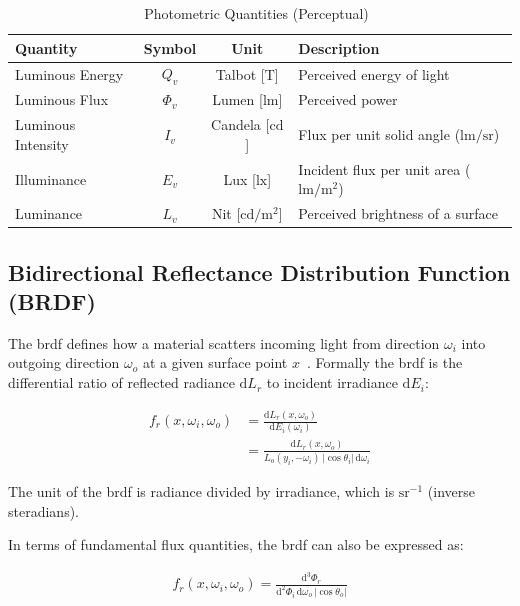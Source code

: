 \begin{table}
    \centering
    \caption{Photometric Quantities (Perceptual)~\cite{tuwien_rendering_2020}}
    \label{tab:photometric-quantities}
    \begin{tabular}{lccl}
        \toprule
        \textbf{Quantity} & \textbf{Symbol} & \textbf{Unit} & \textbf{Description} \\
        \midrule
        Luminous Energy & $Q_v$ & Talbot [$\mathrm{T}$] & Perceived energy of light \\
        Luminous Flux & $\Phi_v$ & Lumen [$\mathrm{lm}$] & Perceived power \\
        Luminous Intensity & $I_v$ & Candela [$\mathrm{cd}$] & Flux per unit solid angle ($\mathrm{lm/sr}$) \\
        Illuminance & $E_v$ & Lux [$\mathrm{lx}$] & Incident flux per unit area ($\mathrm{lm/m^2}$) \\
        Luminance & $L_v$ & Nit [$\mathrm{cd/m^2}$] & Perceived brightness of a surface \\
        \bottomrule
    \end{tabular}
\end{table}

\subsection{Bidirectional Reflectance Distribution Function (BRDF)}\label{subsec:brdf}

The \gls{brdf} defines how a material scatters incoming light from direction $\omega_i$ 
into outgoing direction $\omega_o$ at a given surface point $x$~\cite{136913.136929}.
Formally the \gls{brdf} is the differential ratio of reflected radiance $\mathrm{d}L_r$ 
to incident irradiance $\mathrm{d}E_i$:

\begin{align}
    f_r(x, \omega_i, \omega_o) &= \frac{\mathrm{d} L_r(x, \omega_o)}{\mathrm{d} E_i(\omega_i)} \\
    &= \frac{\mathrm{d} L_r(x, \omega_o)}{L_o(y_i, -\omega_i) \, |\cos\theta_i| \, \mathrm{d}\omega_i}
\end{align}

The unit of the \gls{brdf} is radiance divided by irradiance, which is $\mathrm{sr^{-1}}$ (inverse steradians).

In terms of fundamental flux quantities, the \gls{brdf} can also be expressed as:

\begin{align}
    f_r(x, \omega_i, \omega_o) = \frac{\mathrm{d}^3 \Phi_r}{\mathrm{d}^2 \Phi_i \, \mathrm{d}\omega_o \, |\cos\theta_o|}
\end{align}

